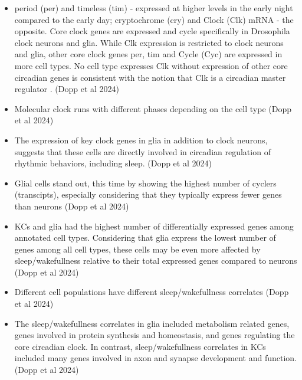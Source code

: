 \documentclass[11pt]{article}
\begin{document}
\begin{itemize}
    \item period (per) and timeless (tim) - expressed at higher levels in the early night compared to the early day;
    cryptochrome (cry) and Clock (Clk) mRNA - the opposite. Core clock genes are expressed and cycle specifically in Drosophila clock
    neurons and glia. While Clk expression is restricted to clock neurons and glia, other core clock genes per, tim and
    Cycle (Cyc) are expressed in more cell types. No cell type expresses Clk without expression of other core circadian genes is
    consistent with the notion that Clk is a circadian master regulator \parencite{doppSinglecellTranscriptomicsReveals2024}.
    (Dopp et al 2024)

    \item Molecular clock runs with different phases depending on the cell type \parencite{doppSinglecellTranscriptomicsReveals2024}
    (Dopp et al 2024)
    
    \item The expression of key clock genes in glia in addition to clock neurons, suggests that these cells are directly
    involved in circadian regulation of rhythmic behaviors, including sleep. \parencite{doppSinglecellTranscriptomicsReveals2024}
    (Dopp et al 2024)

    \item Glial cells stand out, this time by showing the highest number of cyclers (transcipts), especially considering that
    they typically express fewer genes than neurons \parencite{doppSinglecellTranscriptomicsReveals2024}
    (Dopp et al 2024)

    \item KCs and glia had the highest number of differentially expressed genes among annotated cell types.
    Considering that glia express the lowest number of genes among all cell types, these cells may be even more affected by
    sleep/wakefullness relative to their total expressed genes compared to neurons \parencite{doppSinglecellTranscriptomicsReveals2024}
    (Dopp et al 2024)

    \item Different cell populations have different sleep/wakefullness correlates \parencite{doppSinglecellTranscriptomicsReveals2024}
    (Dopp et al 2024)

    \item The sleep/wakefullness correlates in glia included metabolism related genes, genes involved in protein synthesis
    and homeostasis, and genes regulating the core circadian clock. In contrast, sleep/wakefullness correlates in KCs included many
    genes involved in axon and synapse development and function.
    (Dopp et al 2024)


\end{itemize}
\end{document}
